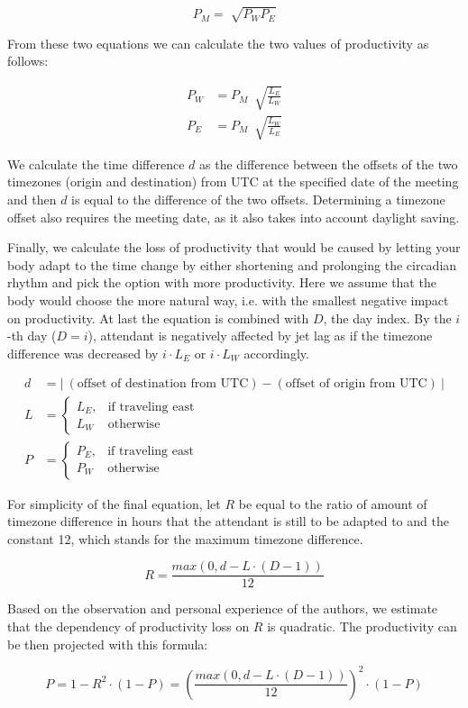 $$P_M = \sqrt[]{P_W P_E}$$

From these two equations we can calculate the two values of productivity as follows:

\begin{align*}
P_W &= P_M \ \sqrt[]{\frac{L_E}{L_W}}\\
P_E &= P_M \ \sqrt[]{\frac{L_W}{L_E}}
\end{align*}

We calculate the time difference $d$ as the difference between the offsets of the two timezones (origin and destination) from UTC at the specified date of the meeting and then $d$ is equal to the difference of the two offsets. Determining a timezone offset also requires the meeting date, as it also takes into account daylight saving.

Finally, we calculate the loss of productivity that would be caused by letting your body adapt to the time change by either shortening and prolonging the circadian rhythm and pick the option with more productivity. Here we assume that the body would choose the more natural way, i.e. with the smallest negative impact on productivity. At last the equation is combined with $D$, the day index. By the $i$-th day ($D = i$), attendant is negatively affected by jet lag as if the timezone difference was decreased by $i\cdot L_E$ or $i \cdot L_W$ accordingly.

\begin{align*}
d &= \Big | \ {(\text{offset of destination from UTC}) - (\text{offset of origin from UTC})} \ \Big | \\
L &= 
\begin{cases}
    L_E ,& \text{if traveling east}\\
    L_W  & \text{otherwise}
\end{cases} \\
P &= 
\begin{cases}
    P_E ,& \text{if traveling east}\\
    P_W  & \text{otherwise}
\end{cases}
\end{align*}

For simplicity of the final equation, let $R$ be equal to the ratio of amount of timezone difference in hours that the attendant is still to be adapted to and the constant 12, which stands for the maximum timezone difference.

$$R = \frac{max(0, d - L \cdot (D - 1))}{12}$$

Based on the observation and personal experience of the authors, we estimate that the dependency of productivity loss on $R$ is quadratic. The productivity can be then projected with this formula:

$$P = 1 - R ^ 2 \cdot (1 - P) = \left( \frac{max(0, d - L \cdot (D - 1))}{12} \right) ^ 2 \cdot (1 - P) $$
